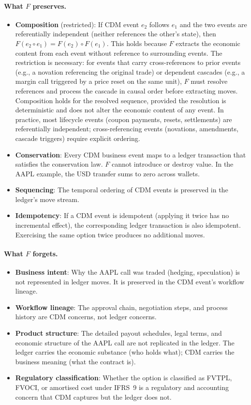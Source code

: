 \documentclass[11pt,a4paper]{article}
\begin{document}
\paragraph{What $F$ preserves.}
\begin{itemize}[nosep]
\item \textbf{Composition} (restricted): If CDM event $e_2$ follows $e_1$ and the two events are referentially independent (neither references the other's state), then $F(e_2 \circ e_1) = F(e_2) \circ F(e_1)$. This holds because $F$ extracts the economic content from each event without reference to surrounding events. The restriction is necessary: for events that carry cross-references to prior events (e.g., a novation referencing the original trade) or dependent cascades (e.g., a margin call triggered by a price reset on the same unit), $F$ must resolve references and process the cascade in causal order before extracting moves. Composition holds for the resolved sequence, provided the resolution is deterministic and does not alter the economic content of any event. In practice, most lifecycle events (coupon payments, resets, settlements) are referentially independent; cross-referencing events (novations, amendments, cascade triggers) require explicit ordering.
\item \textbf{Conservation}: Every CDM business event maps to a ledger transaction that satisfies the conservation law. $F$ cannot introduce or destroy value. In the AAPL example, the USD transfer sums to zero across wallets.
\item \textbf{Sequencing}: The temporal ordering of CDM events is preserved in the ledger's move stream.
\item \textbf{Idempotency}: If a CDM event is idempotent (applying it twice has no incremental effect), the corresponding ledger transaction is also idempotent. Exercising the same option twice produces no additional moves.
\end{itemize}

\paragraph{What $F$ forgets.}
\begin{itemize}[nosep]
\item \textbf{Business intent}: Why the AAPL call was traded (hedging, speculation) is not represented in ledger moves. It is preserved in the CDM event's workflow lineage.
\item \textbf{Workflow lineage}: The approval chain, negotiation steps, and process history are CDM concerns, not ledger concerns.
\item \textbf{Product structure}: The detailed payout schedules, legal terms, and economic structure of the AAPL call are not replicated in the ledger. The ledger carries the economic substance (who holds what); CDM carries the business meaning (what the contract is).
\item \textbf{Regulatory classification}: Whether the option is classified as FVTPL, FVOCI, or amortised cost under IFRS~9 is a regulatory and accounting concern that CDM captures but the ledger does not.
\end{itemize}
\end{document}
